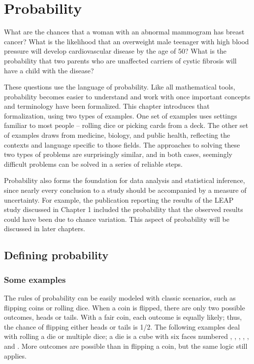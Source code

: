 
\chapter{Probability}
\label{probability}




What are the chances that a woman with an abnormal mammogram has breast cancer?  What is the likelihood that an overweight male teenager with high blood pressure will develop cardiovascular disease by the age of 50?  What is the probability that two parents who are unaffected carriers of cystic fibrosis will have a child with the disease? 

These questions use the language of probability. Like all mathematical tools, probability becomes easier to understand and work with once important concepts and terminology have been formalized. This chapter introduces that formalization, using two types of examples. One set of examples uses settings familiar to most people -- rolling dice or picking cards from a deck. The other set of examples draws from medicine, biology, and public health, reflecting the contexts and language specific to those fields. The approaches to solving these two types of problems are surprisingly similar, and in both cases, seemingly difficult problems can be solved in a series of reliable steps.

Probability also forms the foundation for data analysis and statistical inference, since nearly every conclusion to a study should be accompanied by a measure of uncertainty. For example, the publication reporting the results of the LEAP study discussed in Chapter 1 included the probability that the observed results could have been due to chance variation. This aspect of probability will be discussed in later chapters.

\newpage

\section{Defining probability}
\label{basicsOfProbability}

\subsection{Some examples}

The rules of probability can be easily modeled with classic scenarios, such as flipping coins or rolling dice. When a coin is flipped, there are only two possible outcomes, heads or tails. With a fair coin, each outcome is equally likely; thus, the chance of flipping either heads or tails is 1/2. The following examples deal with rolling a die or multiple dice; a die is a cube with six faces numbered , , , , , and . More outcomes are possible than in flipping a coin, but the same logic still applies.

